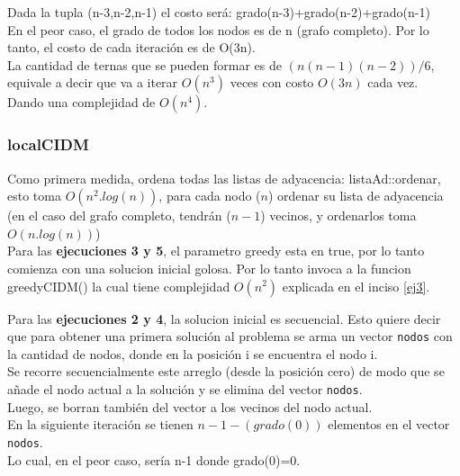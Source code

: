 Dada la tupla (n-3,n-2,n-1) el costo ser\'a: grado(n-3)+grado(n-2)+grado(n-1)\\

En el peor caso, el grado de todos los nodos es de n (grafo completo). Por lo tanto, el costo de cada iteraci\'on es de O(3n).\\

La cantidad de ternas que se pueden formar es de $(n(n-1)(n-2))/6$, equivale a decir que va a iterar $O(n^3)$ veces con costo $O(3n)$ cada vez.\\

Dando una complejidad de $O(n^4)$.

\newpage
\subsubsection{localCIDM}
Como primera medida, ordena todas las listas de adyacencia: listaAd::ordenar, esto toma $O(n^2.log(n))$, para cada nodo ($n$) ordenar su lista de adyacencia (en el caso del grafo completo, tendr\'an ($n-1$) vecinos, y ordenarlos toma $O(n.log(n))$)\\

Para las \textbf{ejecuciones 3 y 5}, el parametro greedy esta en true, por lo tanto comienza con una solucion inicial golosa. Por lo tanto invoca a la funcion greedyCIDM() la cual tiene complejidad $O(n^2)$ explicada en el inciso \ref{ej3}.\\

\bigskip

Para las \textbf{ejecuciones 2 y 4}, la solucion inicial es secuencial. Esto quiere decir que para obtener una primera soluci\'on al problema se arma un vector \texttt{nodos} con la cantidad de nodos, donde en la posici\'on i se encuentra el nodo i.\\

Se recorre secuencialmente este arreglo (desde la posici\'on cero) de modo que se a\~nade el nodo actual a la soluci\'on y se elimina del vector \texttt{nodos}.\\

Luego, se borran tambi\'en del vector a los vecinos del nodo actual.\\

En la siguiente iteraci\'on se tienen $n-1-(grado(0))$ elementos en el vector \texttt{nodos}.\\

Lo cual, en el peor caso, ser\'ia n-1 donde grado(0)=0.\\


